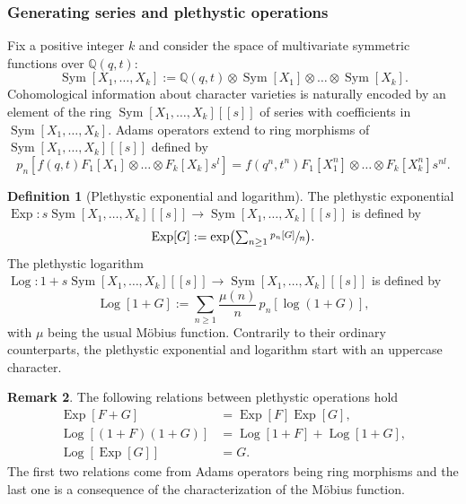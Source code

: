 \documentclass[11pt]{article}
\theoremstyle{definition}
\newtheorem{definition}{Definition}[section]
\newtheorem{remark}[definition]{Remark}
\theoremstyle{plain}
\DeclareMathOperator{\SymF}{Sym}
\DeclareMathOperator{\Exp}{Exp}
\DeclareMathOperator{\Log}{Log}
\begin{document}
\subsubsection{Generating series and plethystic operations}
Fix a positive integer $k$ and consider the space of multivariate symmetric functions over $\mathbb{Q}(q,t)$:
\[
\SymF[X_1,\dots,X_k]:=\mathbb{Q}(q,t)\otimes \SymF[X_1]\otimes\dots\otimes \SymF[X_k].
\]
Cohomological information about character varieties is naturally encoded by an ele\-ment of the ring $\SymF[X_1,\dots,X_k][\![s]\!]$ of series with coefficients in $\SymF[X_1,\dots,X_k]$. Adams operators extend to ring morphisms of $\SymF[X_1,\dots,X_k][\![s]\!]$ defined by
\[
p_n\left[f(q,t)F_1\left[X_1\right]\otimes\dots\otimes F_k\left[X_k\right]s^l\right]=f(q^n,t^n)F_1\left[X_1^n\right]\otimes\dots\otimes F_k\left[X_k^n\right]s^{n l}.
\]
\begin{definition}[Plethystic exponential and logarithm]
The plethystic exponential $\Exp : s \SymF [X_1,\dots,X_k][\![s]\!] \to \SymF [X_1,\dots,X_k][\![s]\!]$ is defined by
\[\textstyle
\Exp [G] := \exp\bigl(\sum_{n\ge 1} \sfrac{p_n[G]}{n} \bigr).
\]
The plethystic logarithm $\Log : 1+ s \SymF [X_1,\dots,X_k][\![s]\!] \to \SymF [X_1,\dots,X_k][\![s]\!]$ is defined by
\[
\Log[1+G]:=\sum_{n\ge 1}\frac{\mu(n)}{n}\,p_n \left[\log(1+G)\right],
\]
with $\mu$ being the usual Möbius function. Contrarily to their ordinary counterparts, the plethystic exponential and logarithm start with an uppercase character.
\end{definition}

\begin{remark}
The following relations between plethystic operations hold
\begin{align*}
\Exp[F+G]&=\Exp[F]\Exp[G],\\
\Log[(1+F)(1+G)]&=\Log[1+F]+\Log[1+G], \\
\Log[\Exp[G]] &=G.
\end{align*}
The first two relations come from Adams operators being ring morphisms and the last one is a consequence of the characterization of the Möbius function.
\end{remark}
\end{document}

